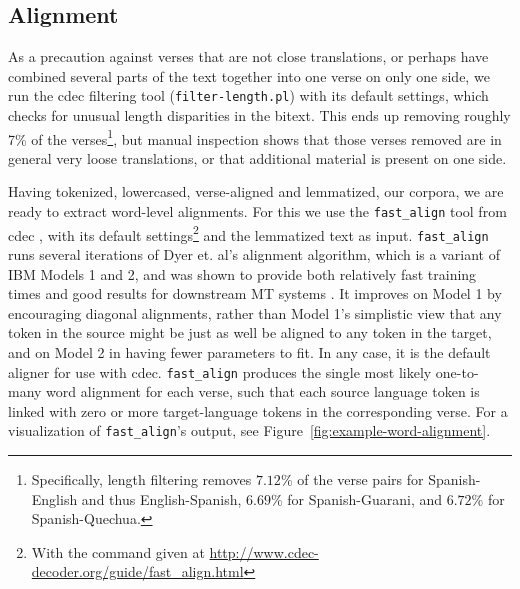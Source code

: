 \subsection{Alignment}
\label{sec:preprocessing-alignment}
As a precaution against verses that are not close translations, or perhaps have
combined several parts of the text together into one verse on only one side, we
run the cdec \cite{dyer-EtAl:2010:Demos} filtering tool
(\texttt{filter-length.pl}) with its default
settings, which checks for unusual length disparities in the bitext. This ends
up removing roughly 7\% of the verses\footnote{Specifically, length filtering
removes $7.12\%$ of the verse pairs for Spanish-English and thus
English-Spanish, $6.69\%$ for Spanish-Guarani, and $6.72\%$ for
Spanish-Quechua.}, but manual inspection shows that those verses removed are in
general very loose translations, or that additional material is present on one
side.

Having tokenized, lowercased, verse-aligned and lemmatized, our corpora, we are
ready to extract word-level alignments.  For this we use the
\texttt{fast\_align} tool from cdec \cite{dyer-EtAl:2010:Demos}, with its
default settings\footnote{With the command given at
\url{http://www.cdec-decoder.org/guide/fast_align.html}} and the lemmatized
text as input.  \texttt{fast\_align} runs several iterations of Dyer et. al's
alignment algorithm, which is a variant of IBM Models 1 and 2, and was shown to
provide both relatively fast training times and good results for downstream MT
systems \cite{dyer-chahuneau-smith:2013:NAACL-HLT}. It improves on Model 1 by
encouraging diagonal alignments, rather than Model 1's simplistic view that any
token in the source might be just as well be aligned to any token in the
target,
and on Model 2 in having fewer parameters to fit. In any case, it is the
default aligner for use with cdec. \texttt{fast\_align} produces the single most
likely one-to-many word alignment for each verse, such that each source
language token is linked with zero or more target-language tokens in the
corresponding verse. For a visualization of \texttt{fast\_align}'s output, see
Figure~\ref{fig:example-word-alignment}.

